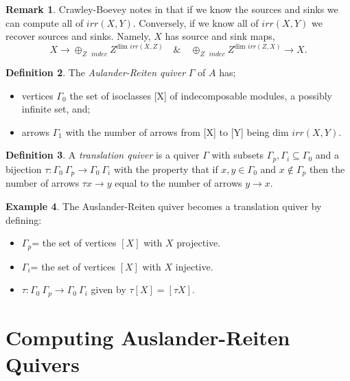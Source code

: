 \documentclass[11.5pt, twoside, a4paper, titlepage]{report}
\theoremstyle{definition}
\newtheorem{mydef}{Definition}[section]
\newtheorem{rem}[mydef]{Remark}
\newtheorem{eg}[mydef]{Example}
\theoremstyle{plain}
\begin{document}
\begin{rem}
 Crawley-Boevey notes in \cite{CB3} that if we know the sources and sinks we can compute all of $irr(X,Y)$. Conversely, if we know all of $irr(X,Y)$ we recover sources and sinks. Namely, $X$ has source and sink maps,
\begin{equation*}
X \to \oplus_{\scriptstyle{Z\text{ } indec}}Z^{\text{dim }irr(X,Z)} \quad \& \quad \oplus_{\scriptstyle{Z\text{ } indec}}Z^{\text{dim }irr(Z, X) }\to X.
\end{equation*}
\end{rem}

\begin{mydef}
The \emph{Aulander-Reiten quiver} $\Gamma$ of $A$ has;
\begin{itemize}
\item vertices $\Gamma_0$ the set of isoclasses [X] of indecomposable modules, a possibly infinite set, and;
\item arrows $\Gamma_1$ with the number of arrows from [X] to [Y] being $\text{dim }irr(X,Y)$.
\end{itemize}
\end{mydef}

\begin{mydef}
A \emph{translation quiver} is a quiver $\Gamma$ with subsets $\Gamma_p, \Gamma_i \subseteq \Gamma_0$ and a bijection $\tau: \Gamma_0\ \Gamma_p \to \Gamma_0 \ \Gamma_i$ with the property that if $x,y \in \Gamma_0$ and $x \notin \Gamma_p$ then the number of arrows $\tau x \to y$ equal to the number of arrows $y \to x$.
\end{mydef}

\begin{eg}
The Auslander-Reiten quiver becomes a translation quiver by defining:
\begin{itemize}
\item $\Gamma_p$= the set of vertices $[X]$ with $X$ projective.
\item $\Gamma_i$= the set of vertices $[X]$ with $X$ injective.
\item $\tau:  \Gamma_0\ \Gamma_p \to \Gamma_0 \ \Gamma_i$ given by $\tau[X]=[\tau X]$.
\end{itemize}
\end{eg}

\section{Computing Auslander-Reiten Quivers}
\end{document}

